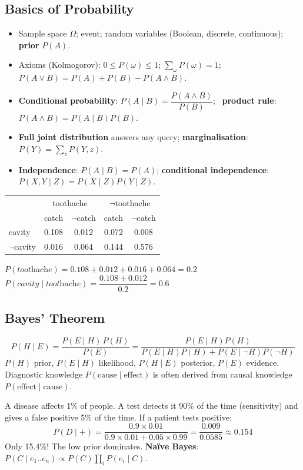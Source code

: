 \subsection{Basics of Probability}
\begin{itemize}
\item Sample space $\Omega$; event; random variables (Boolean, discrete, continuous); \textbf{prior} $P(A)$.
\item Axioms (Kolmogorov): $0\le P(\omega)\le1$; $\sum_{\omega}P(\omega)=1$; $P(A\vee B)=P(A)+P(B)-P(A\wedge B)$.
\item \textbf{Conditional probability}: $P(A\mid B)=\dfrac{P(A\wedge B)}{P(B)}$; \ \textbf{product rule}: $P(A\wedge B)=P(A\mid B)P(B)$.
\item \textbf{Full joint distribution} answers any query; \textbf{marginalisation}: $P(Y)=\sum_{z}P(Y,z)$.
\item \textbf{Independence}: $P(A\mid B)=P(A)$; \textbf{conditional independence}: $P(X,Y\mid Z)=P(X\mid Z)P(Y\mid Z)$.
\end{itemize}
\begin{example}
\small
\begin{tabular}{l|cc|cc}
\rowcolor{navy}&\multicolumn{2}{c|}{\color{gold}toothache}&\multicolumn{2}{c}{\color{gold}$\neg$toothache}\\
\rowcolor{navy}&\color{white}catch&\color{white}$\neg$catch&\color{white}catch&\color{white}$\neg$catch\\\hline
cavity&0.108&0.012&0.072&0.008\\ $\neg$cavity&0.016&0.064&0.144&0.576\\
\end{tabular}\quad
\begin{minipage}{6.2cm}
$P(\textit{toothache})=0.108+0.012+0.016+0.064=0.2$\\
$P(\textit{cavity}\mid\textit{toothache})=\dfrac{0.108+0.012}{0.2}=0.6$
\end{minipage}
\end{example}

\subsection{Bayes' Theorem}
\[\boxed{\;P(H\mid E)=\frac{P(E\mid H)\,P(H)}{P(E)}=\frac{P(E\mid H)P(H)}{P(E\mid H)P(H)+P(E\mid\neg H)P(\neg H)}\;}\]
$P(H)$ prior, $P(E\mid H)$ likelihood, $P(H\mid E)$ posterior, $P(E)$ evidence. Diagnostic knowledge $P(\text{cause}\mid\text{effect})$ is often derived from causal knowledge $P(\text{effect}\mid\text{cause})$.
\begin{example}
\small A disease affects 1\% of people. A test detects it 90\% of the time (sensitivity) and gives a false positive 5\% of the time. If a patient tests positive:
\[P(D\mid +)=\frac{0.9\times0.01}{0.9\times0.01+0.05\times0.99}=\frac{0.009}{0.0585}\approx\mathbf{0.154}\]
Only 15.4\%! The low prior dominates. \textbf{Naïve Bayes}: $P(C\mid e_1..e_n)\propto P(C)\prod_iP(e_i\mid C)$.
\end{example}

